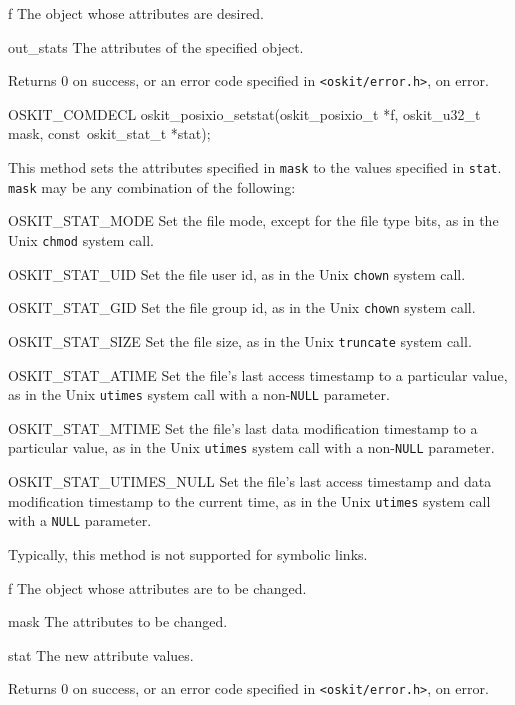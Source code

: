 \begin{apiparm}
	\item[f]
		The object whose attributes are desired.
	\item[out_stats]
		The attributes of the specified object.
\end{apiparm}
\begin{apiret}
	Returns 0 on success, or an error code specified in
	{\tt <oskit/error.h>}, on error.
\end{apiret}


\begin{apisyn}

	\funcproto OSKIT_COMDECL
	oskit_posixio_setstat(oskit_posixio_t *f, 
			      oskit_u32_t mask,
			      const~oskit_stat_t *stat);
\end{apisyn}
\begin{apidesc}
	This method sets the attributes specified in {\tt mask}
	to the values specified in {\tt stat}.  {\tt mask} may
	be any combination of the following:
\begin{icsymlist}
\item[OSKIT_STAT_MODE]
	Set the file mode, except for the file type bits, as in
	the Unix {\tt chmod} system call.  
\item[OSKIT_STAT_UID]
	Set the file user id, as in the Unix {\tt chown} system call.
\item[OSKIT_STAT_GID]  
	Set the file group id, as in the Unix {\tt chown} system call.
\item[OSKIT_STAT_SIZE]
	Set the file size, as in the Unix {\tt truncate} system call.
\item[OSKIT_STAT_ATIME] 
	Set the file's last access timestamp to a particular
	value, as in the Unix {\tt utimes} system call with 
	a non-{\tt NULL} parameter.
\item[OSKIT_STAT_MTIME]
	Set the file's last data modification timestamp to a particular
	value, as in the Unix {\tt utimes} system call 
	with a non-{\tt NULL} parameter. 
\item[OSKIT_STAT_UTIMES_NULL]
	Set the file's last access timestamp and data modification
	timestamp to the current time, as in
	the Unix {\tt utimes} system call with a {\tt NULL}
	parameter.  
\end{icsymlist}

	Typically, this method is not supported for symbolic links.
\end{apidesc}
\begin{apiparm}
	\item[f]
		The object whose attributes are to be changed.
	\item[mask]
		The attributes to be changed. 
	\item[stat]
		The new attribute values.
\end{apiparm}
\begin{apiret}
	Returns 0 on success, or an error code specified in
	{\tt <oskit/error.h>}, on error.
\end{apiret}


